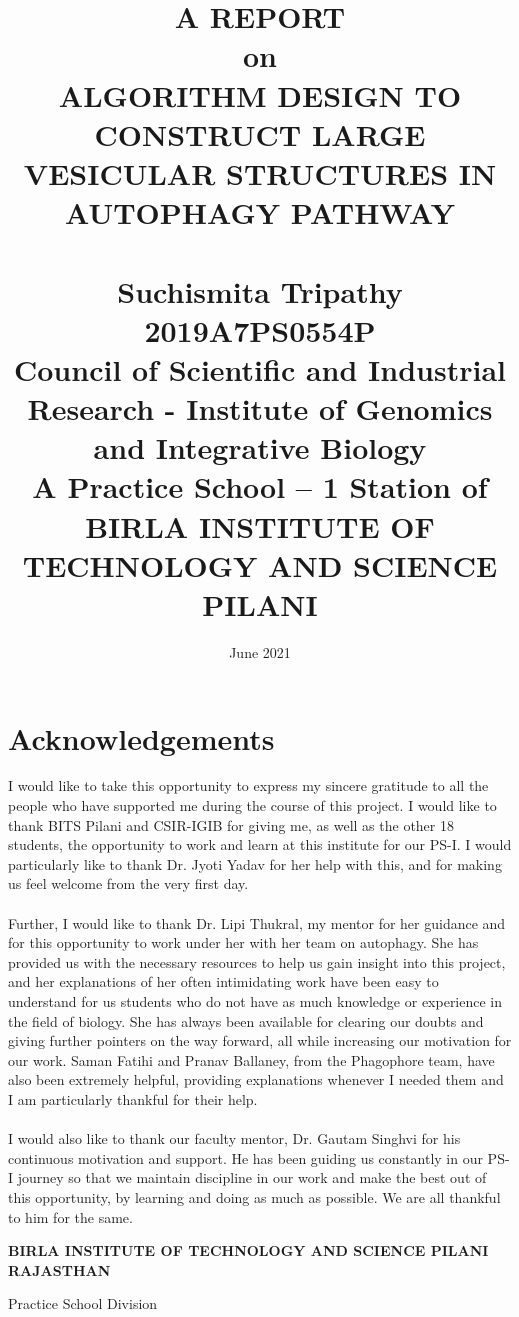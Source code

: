 \documentclass[12pt, a4paper]{report}
\title{A REPORT \\ on \\[0.5in]\textbf{ALGORITHM DESIGN TO CONSTRUCT LARGE VESICULAR STRUCTURES IN AUTOPHAGY PATHWAY} \\~\\ Suchismita Tripathy \\ 2019A7PS0554P \\[1in] \textbf{Council of Scientific and Industrial Research - Institute of Genomics and Integrative Biology} \\
A Practice School – 1 Station of \\[0.75in] BIRLA INSTITUTE OF TECHNOLOGY AND SCIENCE PILANI }
\date{\vspace{-2.0cm}June 2021}
\begin{document}
 
\maketitle 

\section*{Acknowledgements}

I would like to take this opportunity to express my sincere gratitude to all the people who have supported me during the course of this project. I would like to thank BITS Pilani and CSIR-IGIB for giving me, as well as the other 18 students, the opportunity to work and learn at this institute for our PS-I. I would particularly like to thank Dr. Jyoti Yadav for her help with this, and for making us feel welcome from the very first day.\\~\\


Further, I would like to thank Dr. Lipi Thukral, my mentor for her guidance and for this opportunity to work under her with her team on autophagy. She has provided us with the necessary resources to help us gain insight into this project, and her explanations of her often intimidating work have been easy to understand for us students who do not have as much knowledge or experience in the field of biology. She has always been available for clearing our doubts and giving further pointers on the way forward, all while increasing our motivation for our work. Saman Fatihi and Pranav Ballaney, from the Phagophore team, have also been extremely helpful, providing explanations whenever I needed them and I am particularly thankful for their help. \\~\\


I would also like to thank our faculty mentor, Dr. Gautam Singhvi for his continuous motivation and support. He has been guiding us constantly in our PS-I journey so that we maintain discipline in our work and make the best out of this opportunity, by learning and doing as much as possible. We are all thankful to him for the same. 

\newpage

\begin{center} \textbf{BIRLA INSTITUTE OF TECHNOLOGY AND SCIENCE PILANI 
RAJASTHAN } 

Practice School Division 
\end{center}
\end{document}

